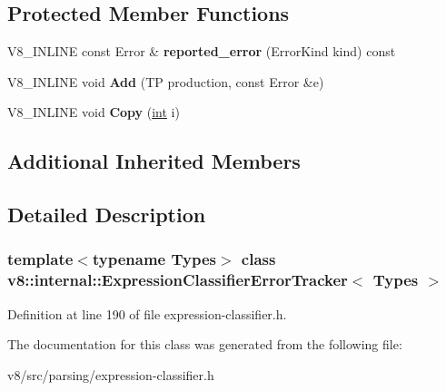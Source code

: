 \subsection*{Protected Member Functions}
\begin{DoxyCompactItemize}
\item 
\mbox{\label{classv8_1_1internal_1_1ExpressionClassifierErrorTracker_a686cacbbadbc9d580d168e2ba20ac457}} 
V8\+\_\+\+I\+N\+L\+I\+NE const Error \& {\bfseries reported\+\_\+error} (Error\+Kind kind) const
\item 
\mbox{\label{classv8_1_1internal_1_1ExpressionClassifierErrorTracker_a93766bd4b74c1e2ab62882e6ad0dabf8}} 
V8\+\_\+\+I\+N\+L\+I\+NE void {\bfseries Add} (TP production, const Error \&e)
\item 
\mbox{\label{classv8_1_1internal_1_1ExpressionClassifierErrorTracker_a82aac1d74f7b1d3c30717b96fbec3745}} 
V8\+\_\+\+I\+N\+L\+I\+NE void {\bfseries Copy} (\mbox{\hyperlink{classint}{int}} i)
\end{DoxyCompactItemize}
\subsection*{Additional Inherited Members}


\subsection{Detailed Description}
\subsubsection*{template$<$typename Types$>$\newline
class v8\+::internal\+::\+Expression\+Classifier\+Error\+Tracker$<$ Types $>$}



Definition at line 190 of file expression-\/classifier.\+h.



The documentation for this class was generated from the following file\+:\begin{DoxyCompactItemize}
\item 
v8/src/parsing/expression-\/classifier.\+h\end{DoxyCompactItemize}
